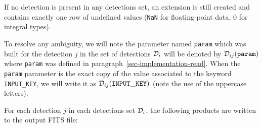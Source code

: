 \documentclass[panstarrs,spec]{panstarrs}
\begin{document}
If no detection is present in any detections set, an extension is
still created and contains exactly one row of undefined values
(\texttt{NaN} for floating-point data, 0 for integral types).

To resolve any ambiguity, we will note the parameter named
\texttt{param} which was built for the detection $j$ in the set of
detections ${\cal D}_{i}$ will be denoted by ${\cal
  D}_{ij}(\mathtt{param})$ where \texttt{param} was defined in
paragraph~\ref{sec-implementation-read}. When the \texttt{param}
parameter is the exact copy of the value associated to the keyword
\texttt{INPUT\_KEY}, we will write it as ${\cal
  D}_{ij}(\mathtt{INPUT\_KEY})$ (note the use of the uppercase
letters).

For each detection $j$ in each detections set ${\cal D}_{i}$, the
following products are written to the output FITS file:
\end{document}
